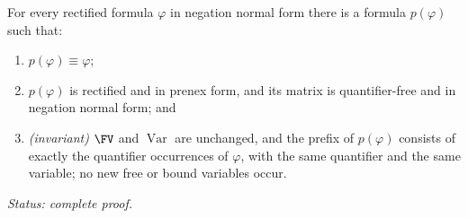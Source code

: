 \begin{lemma}
\label{lem:prenex-extraction}
For every rectified formula \(\varphi\) in negation normal form there is
a formula \(p(\varphi)\) such that:
\begin{enumerate}
  \item \(p(\varphi)\equiv\varphi\);
  \item \(p(\varphi)\) is rectified and in prenex form, and its matrix is
        quantifier-free and in negation normal form; and
  \item \emph{(invariant)} \(\FV\) and \(\operatorname{Var}\) are
        unchanged, and the prefix of \(p(\varphi)\) consists of exactly
        the quantifier occurrences of \(\varphi\), with the same
        quantifier and the same variable; no new free or bound variables
        occur.
\end{enumerate}
\textit{Status: complete proof.}
\end{lemma}
